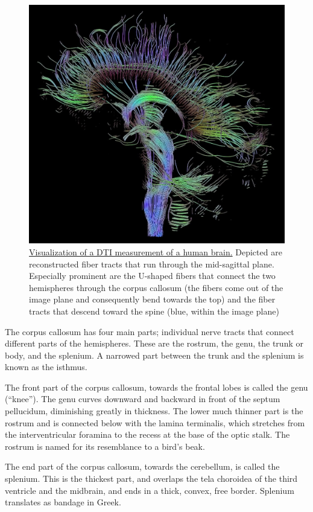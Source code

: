 \begin{figure}

{\centering \includegraphics[width=0.7\linewidth]{./figures/cns/DTI-sagittal-fibers} 

}

\caption{\href{https://commons.wikimedia.org/wiki/File:DTI-sagittal-fibers.jpg}{Visualization of a DTI measurement of a human brain.} Depicted are reconstructed fiber tracts that run through the mid-sagittal plane. Especially prominent are the U-shaped fibers that connect the two hemispheres through the corpus callosum (the fibers come out of the image plane and consequently bend towards the top) and the fiber tracts that descend toward the spine (blue, within the image plane)}\label{fig:visualization}
\end{figure}

The corpus callosum has four main parts; individual nerve tracts that connect different parts of the hemispheres. These are the rostrum, the genu, the trunk or body, and the splenium. A narrowed part between the trunk and the splenium is known as the isthmus.

The front part of the corpus callosum, towards the frontal lobes is called the genu (``knee''). The genu curves downward and backward in front of the septum pellucidum, diminishing greatly in thickness. The lower much thinner part is the rostrum and is connected below with the lamina terminalis, which stretches from the interventricular foramina to the recess at the base of the optic stalk. The rostrum is named for its resemblance to a bird's beak.

The end part of the corpus callosum, towards the cerebellum, is called the splenium. This is the thickest part, and overlaps the tela choroidea of the third ventricle and the midbrain, and ends in a thick, convex, free border. Splenium translates as bandage in Greek.

